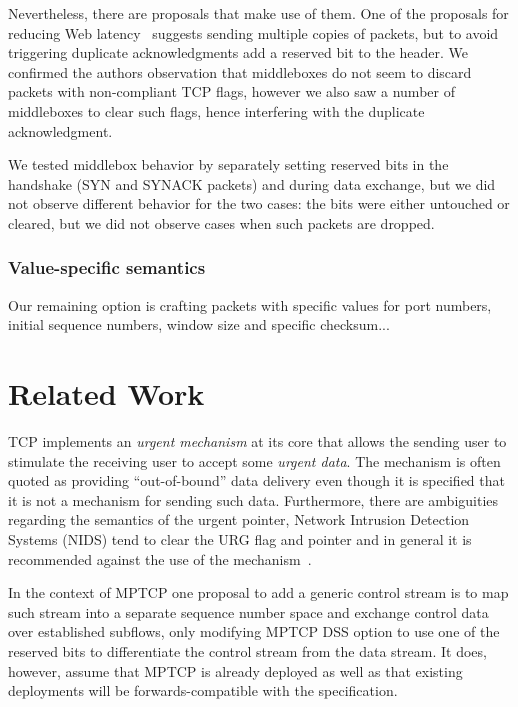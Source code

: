 \documentclass{sig-alternate-10pt}
\begin{document}
Nevertheless, there are proposals that make use of them. One of the proposals for reducing Web latency~\cite{Flach:2013uy} suggests sending multiple copies of packets, but to avoid triggering duplicate acknowledgments add a reserved bit to the header. We confirmed the authors observation that middleboxes do not seem to discard packets with non-compliant TCP flags, however we also saw a number of middleboxes to clear such flags, hence interfering with the duplicate acknowledgment.

We tested middlebox behavior by separately setting reserved bits in the handshake (SYN and SYNACK packets) and during data exchange, but we did not observe different behavior for the two cases: the bits were either untouched or cleared, but we did not observe cases when such packets are dropped.

\subsubsection*{Value-specific semantics}

Our remaining option is crafting packets with specific values for port numbers, initial sequence numbers, window size and specific checksum...

\section{Related Work}
\label{sec:related}

TCP implements an \emph{urgent mechanism} at its core that allows the sending user to stimulate the receiving user to accept some \emph{urgent data}. The mechanism is often quoted as providing ``out-of-bound'' data delivery even though it is specified that it is not a mechanism for sending such data. Furthermore, there are ambiguities regarding the semantics of the urgent pointer, Network Intrusion Detection Systems (NIDS) tend to clear the URG flag and pointer and in general it is recommended against the use of the mechanism~\cite{Gont:2011vi}.

In the context of MPTCP one proposal to add a generic control stream is to map such stream into a separate sequence number space and exchange control data over established subflows, only modifying MPTCP DSS option to use one of the reserved bits to differentiate the control stream from the data stream. It does, however, assume that MPTCP is already deployed as well as that existing deployments will be forwards-compatible with the specification.
\end{document}

